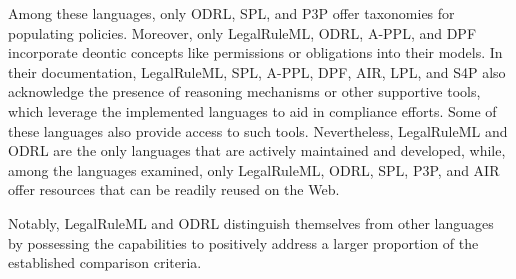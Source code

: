 Among these languages, only ODRL, SPL, and P3P offer taxonomies for populating policies.
Moreover, only LegalRuleML, ODRL, A-PPL, and DPF incorporate deontic concepts like permissions or obligations into their models.
In their documentation, LegalRuleML, SPL, A-PPL, DPF, AIR, LPL, and S4P also acknowledge the presence of reasoning mechanisms or other supportive tools, which leverage the implemented languages to aid in compliance efforts.
Some of these languages also provide access to such tools.
Nevertheless, LegalRuleML and ODRL are the only languages that are actively maintained and developed, while, among the languages examined, only LegalRuleML, ODRL, SPL, P3P, and AIR offer resources that can be readily reused on the Web.

Notably, LegalRuleML and ODRL distinguish themselves from other languages by possessing the capabilities to positively address a larger proportion of the established comparison criteria.